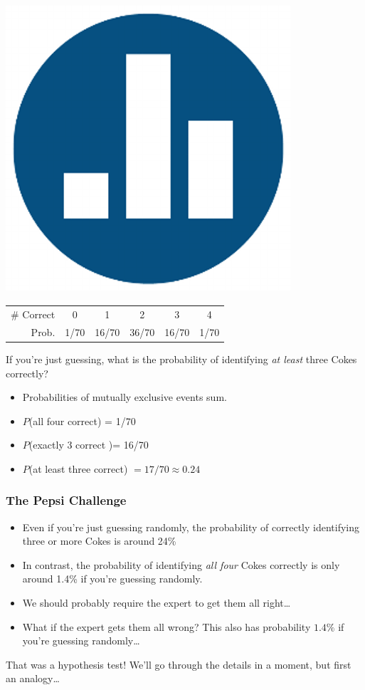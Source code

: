 \begin{frame}
	\frametitle{\includegraphics[scale = 0.05]{./images/clicker}}
	\begin{center}
		\begin{tabular}{rccccc}
		\hline
		\# Correct & 0 & 1 & 2 & 3 & 4\\
		Prob.&1/70 & 16/70 & 36/70 & 16/70 &1/70\\
		\hline
		\end{tabular}
	\end{center}
	If you're just guessing, what is the probability of identifying \alert{\emph{at least}} three Cokes correctly?
	\pause
	\begin{itemize}
\item Probabilities of mutually exclusive events sum. 
\item $P$(all four correct) = 1/70 
\item $P$(exactly 3 correct )= 16/70 
\item $P$(at least three correct) $ = 17/70 \approx 0.24$

\end{itemize}
\end{frame}

\begin{frame}
\frametitle{The Pepsi Challenge}
	\begin{itemize}
\item Even if you're just guessing randomly, the probability of correctly identifying three or more Cokes is around 24\%  \pause
\item In contrast, the probability of identifying \emph{\alert{all four}} Cokes correctly is only around 1.4\% if you're guessing randomly.  \pause
\item We should probably require the expert to get them all right\dots \pause 
\item What if the expert gets them all wrong? This also has probability $1.4\%$ if you're guessing randomly\dots \pause
\end{itemize}


\alert{That was a hypothesis test! We'll go through the details in a moment, but first an analogy\dots}
\end{frame}

